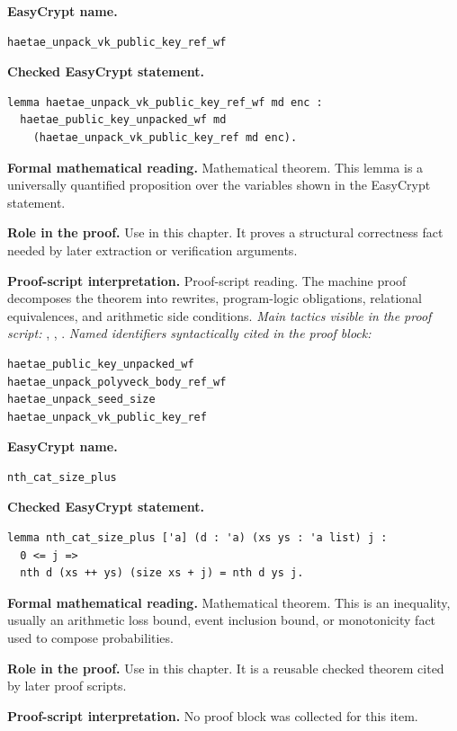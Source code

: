 \begin{formaltheorem}
\noindent\textbf{EasyCrypt name.}
\begin{lstlisting}[language=EasyCrypt,basicstyle=\ttfamily\scriptsize]
haetae_unpack_vk_public_key_ref_wf
\end{lstlisting}
\noindent\textbf{Checked EasyCrypt statement.}
\begin{lstlisting}[language=EasyCrypt,basicstyle=\ttfamily\scriptsize]
lemma haetae_unpack_vk_public_key_ref_wf md enc :
  haetae_public_key_unpacked_wf md
    (haetae_unpack_vk_public_key_ref md enc).
\end{lstlisting}
\noindent\textbf{Formal mathematical reading.}
Mathematical theorem. This lemma is a universally quantified proposition over the variables shown in the EasyCrypt statement.

\noindent\textbf{Role in the proof.}
Use in this chapter. It proves a structural correctness fact needed by later extraction or verification arguments.

\noindent\textbf{Proof-script interpretation.}
Proof-script reading. The machine proof decomposes the theorem into rewrites, program-logic obligations, relational equivalences, and arithmetic side conditions.
\emph{Main tactics visible in the proof script:} , , .
\emph{Named identifiers syntactically cited in the proof block:}
\begin{lstlisting}[language=EasyCrypt,basicstyle=\ttfamily\scriptsize]
haetae_public_key_unpacked_wf
haetae_unpack_polyveck_body_ref_wf
haetae_unpack_seed_size
haetae_unpack_vk_public_key_ref
\end{lstlisting}

\end{formaltheorem}

\begin{formaltheorem}
\noindent\textbf{EasyCrypt name.}
\begin{lstlisting}[language=EasyCrypt,basicstyle=\ttfamily\scriptsize]
nth_cat_size_plus
\end{lstlisting}
\noindent\textbf{Checked EasyCrypt statement.}
\begin{lstlisting}[language=EasyCrypt,basicstyle=\ttfamily\scriptsize]
lemma nth_cat_size_plus ['a] (d : 'a) (xs ys : 'a list) j :
  0 <= j =>
  nth d (xs ++ ys) (size xs + j) = nth d ys j.
\end{lstlisting}
\noindent\textbf{Formal mathematical reading.}
Mathematical theorem. This is an inequality, usually an arithmetic loss bound, event inclusion bound, or monotonicity fact used to compose probabilities.

\noindent\textbf{Role in the proof.}
Use in this chapter. It is a reusable checked theorem cited by later proof scripts.

\noindent\textbf{Proof-script interpretation.}
No proof block was collected for this item.

\end{formaltheorem}

